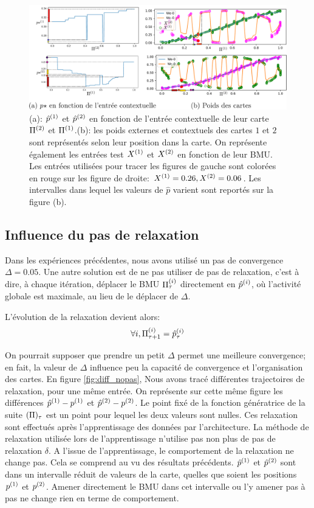 \documentclass[../main]{subfiles}
\begin{document}
\begin{figure}
	\includegraphics[width=\textwidth]{am_w_006}
	\caption{(a): $\hat{p}^{({1})}$ et $\hat{p}^{({2})}$ en fonction de l'entrée contextuelle de leur carte $\Pi^{({2})}$ et $\Pi^{({1})}$.(b): les poids externes et contextuels des cartes $1$ et $2$ sont représentés selon leur position dans la carte. On représente également les entrées test $X^{({1})}$ et $X^{({2})}$ en fonction de leur BMU. Les entrées utilisées pour tracer les figures de gauche sont colorées en rouge sur les figure de droite: $X^{({1})}=0.26,X^{({2})}=0.06$. Les intervalles dans lequel les valeurs de $\hat{p}$ varient sont reportés sur la figure (b).}
	\label{fig:w006}
	\end{figure}

\subsection{Influence du pas de relaxation}

Dans les expériences précédentes, nous avons utilisé un pas de convergence $\Delta=0.05$.
Une autre solution est de ne pas utiliser de pas de relaxation, c'est à dire, à chaque itération, déplacer le BMU $\Pi^{({i})}_\tau$ directement en $\hat{p}^{({i})}$, où l'activité globale est maximale, au lieu de le déplacer de $\Delta$.


L'évolution de la relaxation devient alors:
\begin{equation}
\forall i, \Pi^{({i})}_{\tau+1} = \hat{p}^{({i})}_{\tau}
\end{equation}

On pourrait supposer que prendre un petit $\Delta$ permet une meilleure convergence; en fait, la valeur de $\Delta$ influence peu la capacité de convergence et l'organisation des cartes.
En figure \ref{fig:diff_nopas}, Nous avons tracé différentes trajectoires de relaxation, pour une même entrée. 
On représente sur cette même figure les différences ${\hat{p}}^{({1})} - p^{({1})}$ et ${\hat{p}}^{({2})} - p^{({2})}$. Le point fixé de la fonction génératrice de la suite $(\Pi)_\tau$ est un point pour lequel les deux valeurs sont nulles.
Ces relaxation sont effectués après l'apprentissage des données par l'architecture. La méthode de relaxation utilisée lors de l'apprentissage n'utilise pas non plus de pas de relaxation $\delta$.
A l'issue de l'apprentissage, le comportement de la relaxation ne change pas. 
Cela se comprend au vu des résultats précédents. $\hat{p}^{({1})}$ et $\hat{p}^{({2})}$ sont dans un intervalle réduit de valeurs de la carte, quelles que soient les positions $p^{({1})}$ et $p^{({2})}$. Amener directement le BMU dans cet intervalle ou l'y amener pas à pas ne change rien en terme de comportement. 
\end{document}
